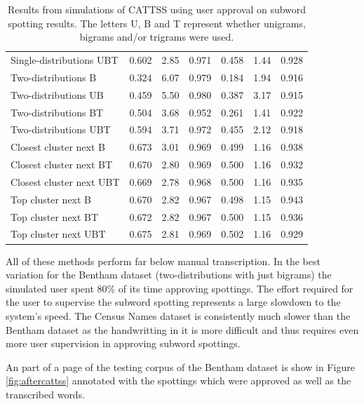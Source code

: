 \documentclass[ms,electronic,twosidetoc,letterpaper,chaptercenter,parttop,lof,lot]{byumsphd}
\begin{document}
\begin{table}
\begin{tabular}{| l | c c c | c c c |}
  Single-distributions UBT & 0.602 & 2.85 & 0.971 & 0.458 & 1.44 & 0.928 \\
  Two-distributions B & 0.324 & 6.07 & 0.979 & 0.184 & 1.94 & 0.916 \\
  Two-distributions UB & 0.459 & 5.50 & 0.980 & 0.387 & 3.17 & 0.915 \\
  Two-distributions BT & 0.504 & 3.68 & 0.952 & 0.261 & 1.41 & 0.922 \\
  Two-distributions UBT & 0.594 & 3.71 & 0.972 & 0.455 & 2.12 & 0.918 \\
  Closest cluster next B & 0.673 & 3.01 & 0.969 & 0.499 & 1.16 & 0.938 \\
  Closest cluster next BT & 0.670 & 2.80 & 0.969 & 0.500 & 1.16 & 0.932 \\
  Closest cluster next UBT & 0.669 & 2.78 & 0.968 & 0.500 & 1.16 & 0.935 \\
  Top cluster next B & 0.670 & 2.82 & 0.967 & 0.498 & 1.15 & 0.943 \\
  Top cluster next BT & 0.672 & 2.82 & 0.967 & 0.500 & 1.15 & 0.936 \\
  Top cluster next UBT & 0.675 & 2.81 & 0.969 & 0.502 & 1.16 & 0.929 \\
  \hline  
\end{tabular}
\caption{Results from simulations of CATTSS using user approval on subword spotting results. The letters U, B and T represent whether unigrams, bigrams and/or trigrams were used.}
\label{tab:appresults}
\end{table}

All of these methods perform far below manual transcription. In the best variation for the Bentham dataset (two-distributions with just bigrams) the simulated user spent 80\% of its time approving spottings. The effort required for the user to supervise the subword spotting represents a large slowdown to the system's speed. The Census Names dataset is consistently much slower than the Bentham dataset as the handwritting in it is more difficult and thus requires even more user supervision in approving subword spottings.

An part of a page of the testing corpus of the Bentham dataset is show in Figure \ref{fig:aftercattss} annotated with the spottings which were approved as well as the transcribed words.
\end{document}

